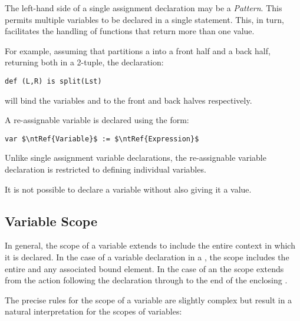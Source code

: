 The left-hand side of a single assignment declaration may be a \emph{Pattern}. This permits multiple variables to be declared in a single statement. This, in turn, facilitates the handling of functions that return more than one value.

For example, assuming that  partitions a  into a front half and a back half, returning both in a 2-tuple, the declaration:
\begin{lstlisting}
def (L,R) is split(Lst)
\end{lstlisting}
will bind the variables  and  to the front and back halves respectively.

A re-assignable variable is declared using the form:
\begin{lstlisting}[mathescape=true]
var $\ntRef{Variable}$ := $\ntRef{Expression}$
\end{lstlisting}

\begin{aside}
Unlike single assignment variable declarations, the re-assignable variable declaration is restricted to defining individual variables.
\end{aside}

\begin{aside}
It is not possible to declare a variable without also giving it a value.
\end{aside}

\subsection{Variable Scope}
\label{scope}
\hypertarget{Scope}{}

In general, the scope of a variable extends to include the entire context in which it is declared. In the case of a variable declaration in a , the scope includes the entire  and any associated bound element. In the case of an  the scope extends from the action following the declaration through to the end of the enclosing .

The precise rules for the scope of a variable are slightly complex but result in a natural interpretation for the scopes of variables:

